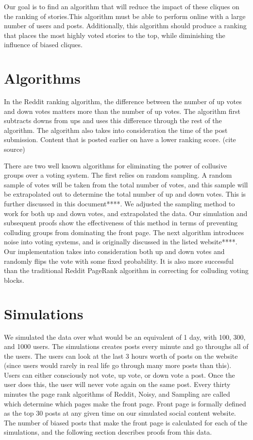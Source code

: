 \documentclass[12pt, oneside]{amsart}
\begin{document}
Our goal is to find an algorithm that will reduce the impact of these cliques on the ranking of stories.This algorithm must be able to perform online with a large number of users and posts. Additionally, this algorithm should produce a ranking that places the most highly voted stories to the top, while diminishing the influence of biased cliques.


\section{Algorithms}

In the Reddit ranking algorithm, the difference between the number of up votes and down votes matters more than the number of up votes.  The algorithm first subtracts downs from ups and uses this difference through the rest of the algorithm.  The algorithm also takes into consideration the time of the post submission.  Content that is posted earlier on have a lower ranking score.  (cite source)

\vspace{.2cm}

There are two well known algorithms for eliminating the power of collusive groups over a voting system.  The  first relies on random sampling.  A random sample of votes will be taken from the total number of votes, and this sample will be extrapolated out to determine the total number of up and down votes.  This is further discussed in this document****.  We adjusted the sampling method  to work for both up and down votes, and extrapolated the data.  Our simulation and subsequent proofs show the effectiveness of this method in terms of preventing colluding groups from dominating the front page.  The next algorithm introduces noise into voting systems, and is originally discussed in the listed website****.  Our implementation takes into consideration both up and down votes and randomly flips the vote with some fixed probability.  It is also more successful than the traditional Reddit PageRank algorithm in correcting for colluding voting blocks.

\section{Simulations}

We simulated the data over what would be an equivalent of 1 day, with 100, 300, and 1000 users.  The simulations creates posts every minute and go throughs all of the users.  The users can look at the last 3 hours worth of posts on the website (since users would rarely in real life go through many more posts than this).  Users can either consciously not vote, up vote, or down vote a post.  Once the user does this, the user will never vote again on the same post.  Every thirty minutes the page rank algorithms of Reddit, Noisy, and Sampling are called which determine which pages make the front page.  Front page is formally defined as the top 30 posts at any given time on our simulated social content website.  The number of biased posts that make the front page is calculated for each of the simulations, and the following section describes proofs from this data.
\end{document}
